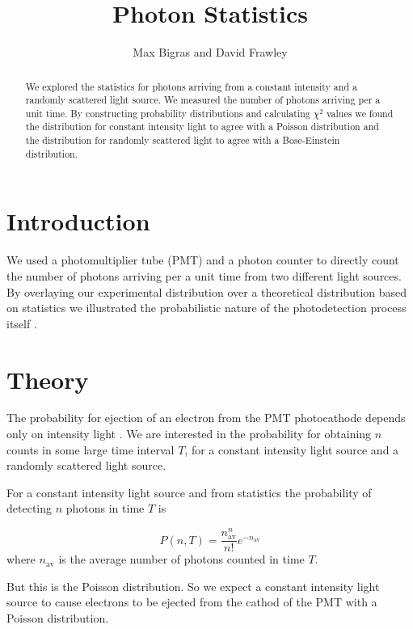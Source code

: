 
\title{Photon Statistics}
\author{Max Bigras and David Frawley}



\maketitle

\begin{abstract}
We explored the statistics for photons arriving from a constant intensity and a randomly scattered light source. We measured the number of photons arriving per a unit time. By constructing probability distributions and calculating $\chi^{2}$ values we found the distribution for constant intensity light to agree with a Poisson distribution and the distribution for randomly scattered light to agree with a Bose-Einstein distribution.
\end{abstract}

\section{Introduction}
We used a photomultiplier tube (PMT) and a photon counter to directly count the number of photons arriving per a unit time from two different light sources. By overlaying our experimental distribution over a theoretical distribution based on statistics we illustrated the probabilistic nature of the photodetection process itself \cite{koc}.



\section{Theory}
The probability for ejection of an electron from the PMT photocathode depends only on intensity light \cite{manual}. We are interested in the probability for obtaining $n$ counts in some large time interval $T$, for a constant intensity light source and a randomly scattered light source. 

For a constant intensity light source and from statistics the probability of detecting $n$ photons in time $T$ is

\begin{equation}
P(n,T) = \frac{n_{\mathrm{av}}^{n}}{n!}e^{-n_{\mathrm{av}}}
\label{poisson}
\end{equation}
where $n_{\mathrm{av}}$ is the average number of photons counted in time $T$.

But this is the Poisson distribution. So we expect a constant intensity light source to cause electrons to be ejected from the cathod of the PMT with a Poisson distribution.

